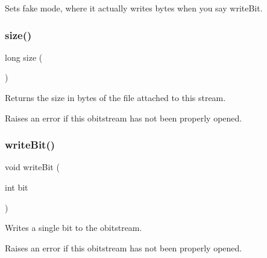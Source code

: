 Sets \textquotesingle{}fake\textquotesingle{} mode, where it actually writes bytes when you say write\+Bit. 

\mbox{\label{classobitstream_a22727e9c338fb1aaa6722031445373c3}} 
\subsubsection{\texorpdfstring{size()}{size()}}
{\footnotesize\ttfamily long size (\begin{DoxyParamCaption}{ }\end{DoxyParamCaption})\hspace{0.3cm}{\ttfamily [inherited]}}



Returns the size in bytes of the file attached to this stream. 

Raises an error if this obitstream has not been properly opened. \mbox{\label{classobitstream_a487c88ba2560a4657d18c3edb7d9d247}} 
\subsubsection{\texorpdfstring{write\+Bit()}{writeBit()}}
{\footnotesize\ttfamily void write\+Bit (\begin{DoxyParamCaption}\item[{int}]{bit }\end{DoxyParamCaption})\hspace{0.3cm}{\ttfamily [inherited]}}



Writes a single bit to the obitstream. 

Raises an error if this obitstream has not been properly opened. 